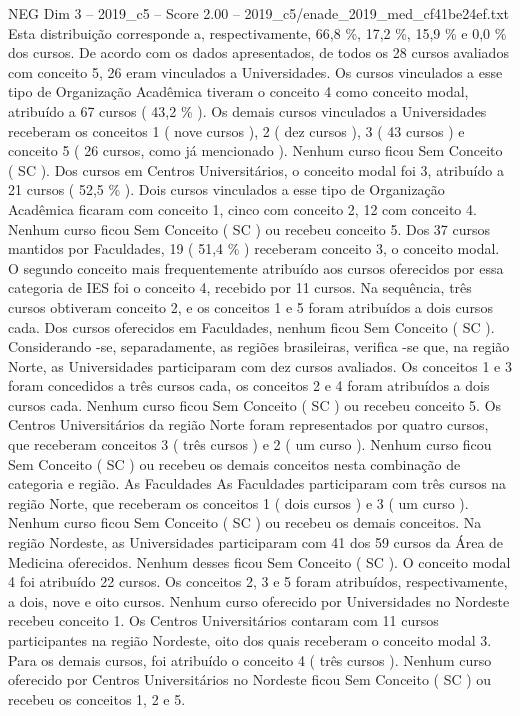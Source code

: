 \begin{textsample}{NEG Dim 3 – 2019\_c5 – Score 2.00 – 2019\_c5/enade\_2019\_med\_cf41be24ef.txt}
Esta distribuição corresponde a, respectivamente, 66,8 \%, 17,2 \%, 15,9 \% e 0,0 \% dos cursos.
De acordo com os dados apresentados, de todos os 28 cursos avaliados com conceito 5, 26 eram vinculados a Universidades.
Os cursos vinculados a esse tipo de Organização Acadêmica tiveram o conceito 4 como conceito modal, atribuído a 67 cursos ( 43,2 \% ).
Os demais cursos vinculados a Universidades receberam os conceitos 1 ( nove cursos ), 2 ( dez cursos ), 3 ( 43 cursos ) e conceito 5 ( 26 cursos, como já mencionado ).
Nenhum curso ficou Sem Conceito ( SC ).
Dos cursos em Centros Universitários, o conceito modal foi 3, atribuído a 21 cursos ( 52,5 \% ).
Dois cursos vinculados a esse tipo de Organização Acadêmica ficaram com conceito 1, cinco com conceito 2, 12 com conceito 4.
Nenhum curso ficou Sem Conceito ( SC ) ou recebeu conceito 5.
Dos 37 cursos mantidos por Faculdades, 19 ( 51,4 \% ) receberam conceito 3, o conceito modal.
O segundo conceito mais frequentemente atribuído aos cursos oferecidos por essa categoria de IES foi o conceito 4, recebido por 11 cursos.
Na sequência, três cursos obtiveram conceito 2, e os conceitos 1 e 5 foram atribuídos a dois cursos cada.
Dos cursos oferecidos em Faculdades, nenhum ficou Sem Conceito ( SC ).
Considerando -se, separadamente, as regiões brasileiras, verifica -se que, na região Norte, as Universidades participaram com dez cursos avaliados.
Os conceitos 1 e 3 foram concedidos a três cursos cada, os conceitos 2 e 4 foram atribuídos a dois cursos cada.
Nenhum curso ficou Sem Conceito ( SC ) ou recebeu conceito 5.
Os Centros Universitários da região Norte foram representados por quatro cursos, que receberam conceitos 3 ( três cursos ) e 2 ( um curso ).
Nenhum curso ficou Sem Conceito ( SC ) ou recebeu os demais conceitos nesta combinação de categoria e região.
As Faculdades As Faculdades participaram com três cursos na região Norte, que receberam os conceitos 1 ( dois cursos ) e 3 ( um curso ).
Nenhum curso ficou Sem Conceito ( SC ) ou recebeu os demais conceitos.
Na região Nordeste, as Universidades participaram com 41 dos 59 cursos da Área de Medicina oferecidos.
Nenhum desses ficou Sem Conceito ( SC ).
O conceito modal 4 foi atribuído 22 cursos.
Os conceitos 2, 3 e 5 foram atribuídos, respectivamente, a dois, nove e oito cursos.
Nenhum curso oferecido por Universidades no Nordeste recebeu conceito 1.
Os Centros Universitários contaram com 11 cursos participantes na região Nordeste, oito dos quais receberam o conceito modal 3.
Para os demais cursos, foi atribuído o conceito 4 ( três cursos ).
Nenhum curso oferecido por Centros Universitários no Nordeste ficou Sem Conceito ( SC ) ou recebeu os conceitos 1, 2 e 5.

\end{textsample}
